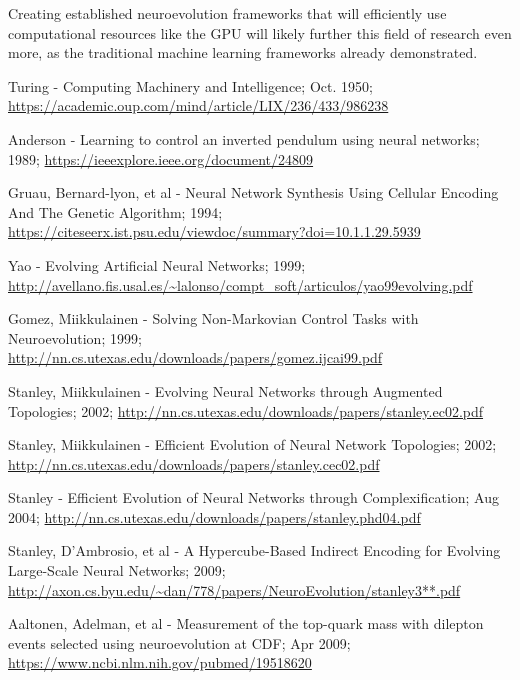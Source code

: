 \documentclass[journal, a4paper]{IEEEtran}
\begin{document}
Creating established neuroevolution frameworks that will efficiently use computational resources like the GPU will likely further this field of research even more, as the traditional machine learning frameworks already demonstrated.




\begin{thebibliography}{5}
    
    Turing - Computing Machinery and Intelligence; Oct. 1950;
    \url{https://academic.oup.com/mind/article/LIX/236/433/986238}
    
    Anderson - Learning to control an inverted pendulum using neural networks; 1989;
    \url{https://ieeexplore.ieee.org/document/24809}
    
    Gruau, Bernard-lyon, et al - Neural Network Synthesis Using Cellular Encoding And The Genetic Algorithm; 1994;
    \url{https://citeseerx.ist.psu.edu/viewdoc/summary?doi=10.1.1.29.5939}
    
    Yao - Evolving Artificial Neural Networks; 1999;
    \url{http://avellano.fis.usal.es/~lalonso/compt_soft/articulos/yao99evolving.pdf}
    
    Gomez, Miikkulainen - Solving Non-Markovian Control Tasks with Neuroevolution; 1999;
    \url{http://nn.cs.utexas.edu/downloads/papers/gomez.ijcai99.pdf}
    
    Stanley, Miikkulainen - Evolving Neural Networks through Augmented Topologies; 2002;
    \url{http://nn.cs.utexas.edu/downloads/papers/stanley.ec02.pdf}
    
    Stanley, Miikkulainen - Efficient Evolution of Neural Network Topologies; 2002;
    \url{http://nn.cs.utexas.edu/downloads/papers/stanley.cec02.pdf}
    
    Stanley - Efficient Evolution of Neural Networks through Complexification; Aug 2004;
    \url{http://nn.cs.utexas.edu/downloads/papers/stanley.phd04.pdf}
    
    Stanley, D’Ambrosio, et al - A Hypercube-Based Indirect Encoding for Evolving Large-Scale Neural Networks; 2009;
    \url{http://axon.cs.byu.edu/~dan/778/papers/NeuroEvolution/stanley3**.pdf}
    
    Aaltonen, Adelman, et al - Measurement of the top-quark mass with dilepton events selected using neuroevolution at CDF; Apr 2009;
    \url{https://www.ncbi.nlm.nih.gov/pubmed/19518620}
    

\end{thebibliography}
\end{document}
